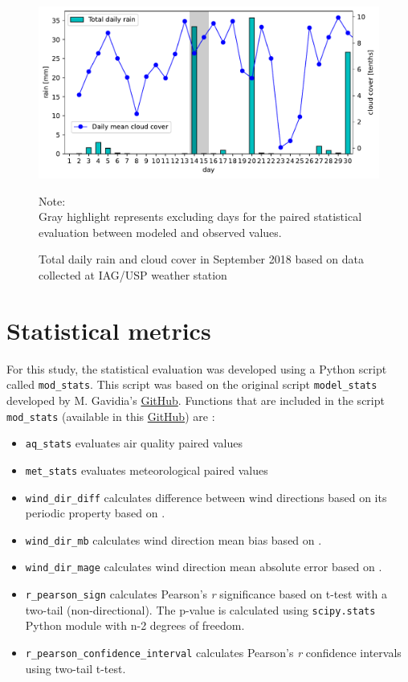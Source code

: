   	\begin{figure}
  		\includegraphics[width=1\textwidth]{fig/rain_cc.pdf}
  		\caption{Total daily rain and cloud cover in September 2018 based on data collected at IAG/USP weather station}
  		{\scriptsize Note:\\ Gray highlight represents excluding days for the paired statistical evaluation between modeled and observed values.}
  		\label{fig:rain_sep18}
  	\end{figure}
		

%
%

 \chapter{Statistical metrics}\label{ap04}
 For this study, the statistical evaluation was developed using a Python script called \verb|mod_stats|.
  This script was based on the original script \verb|model_stats| developed by M. Gavidia's \href{https://github.com/quishqa/WRF-Chem_SP/tree/master/wrf_sp_eval}{GitHub}.
  Functions that are included in the script \verb|mod_stats| (available in this \href{https://github.com/adelgadop/Master_dissertation/tree/main/04_wrfchem_scripts}{GitHub}) are :
  
  \begin{itemize}
  	\item \verb|aq_stats| evaluates air quality paired values
  	\item \verb|met_stats| evaluates meteorological paired values
  	\item \verb|wind_dir_diff| calculates difference between wind directions based on its periodic property based on \citet{Reboredo2015}.
  	\item \verb|wind_dir_mb| calculates wind direction mean bias based on \citet{Reboredo2015}.
  	\item \verb|wind_dir_mage| calculates wind direction mean absolute error based on \citet{Reboredo2015}.
  	\item \verb|r_pearson_sign| calculates Pearson's \textit{r} significance based on t-test with a two-tail (non-directional). The p-value is calculated using \verb|scipy.stats| Python module with n-2 degrees of freedom.
  	\item \verb|r_pearson_confidence_interval| calculates Pearson's \textit{r} confidence intervals using two-tail t-test.
  \end{itemize}
 
